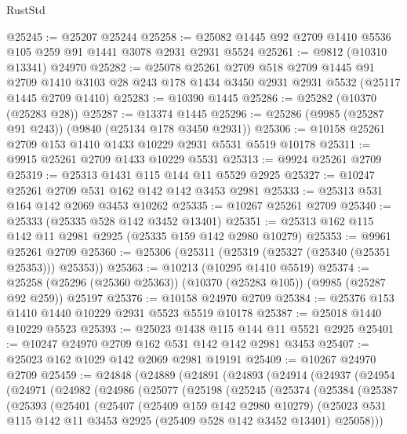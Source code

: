 \begin{lexlean}{RustStd}
\begin{coremodule}
@25245 := @25207 @25244
@25258 := @25082 @1445 @92 @2709 @1410 @5536 @105 @259 @91 @1441 @3078 @2931 @2931 @5524
@25261 := @9812 (@10310 @13341) @24970
@25282 := @25078
    @25261
    @2709
    @518
    @2709
    @1445
    @91
    @2709
    @1410
    @3103
    @28
    @243
    @178
    @1434
    @3450
    @2931
    @2931
    @5532
    (@25117 @1445 @2709 @1410)
@25283 := @10390 @1445
@25286 := @25282 (@10370 (@25283 @28))
@25287 := @13374 @1445
@25296 := @25286 (@9985 (@25287 @91 @243)) (@9840 (@25134 @178 @3450 @2931))
@25306 := @10158 @25261 @2709 @153 @1410 @1433 @10229 @2931 @5531 @5519 @10178
@25311 := @9915 @25261 @2709 @1433 @10229 @5531
@25313 := @9924 @25261 @2709
@25319 := @25313 @1431 @115 @144 @11 @5529 @2925
@25327 := @10247 @25261 @2709 @531 @162 @142 @142 @3453 @2981
@25333 := @25313 @531 @164 @142 @2069 @3453 @10262
@25335 := @10267 @25261 @2709
@25340 := @25333 (@25335 @528 @142 @3452 @13401)
@25351 := @25313 @162 @115 @142 @11 @2981 @2925 (@25335 @159 @142 @2980 @10279)
@25353 := @9961 @25261 @2709
@25360 := @25306 (@25311 (@25319 (@25327 (@25340 (@25351 @25353))) @25353))
@25363 := @10213 (@10295 @1410 @5519)
@25374 := @25258 (@25296 (@25360 @25363)) (@10370 (@25283 @105)) (@9985 (@25287 @92 @259)) @25197
@25376 := @10158 @24970 @2709
@25384 := @25376 @153 @1410 @1440 @10229 @2931 @5523 @5519 @10178
@25387 := @25018 @1440 @10229 @5523
@25393 := @25023 @1438 @115 @144 @11 @5521 @2925
@25401 := @10247 @24970 @2709 @162 @531 @142 @142 @2981 @3453
@25407 := @25023 @162 @1029 @142 @2069 @2981 @19191
@25409 := @10267 @24970 @2709
@25459 := @24848
    (@24889
      (@24891
        (@24893
          (@24914
            (@24937
              (@24954
                (@24971
                  (@24982
                    (@24986
                      (@25077
                        (@25198
                          (@25245
                            (@25374
                              (@25384
                                (@25387
                                  (@25393
                                    (@25401
                                      (@25407
                                        (@25409 @159 @142 @2980 @10279)
                                        (@25023
                                          @531
                                          @115
                                          @142
                                          @11
                                          @3453
                                          @2925
                                          (@25409 @528 @142 @3452 @13401)
                                          @25058)))

\end{coremodule}
\end{lexlean}

